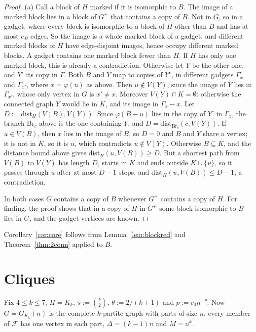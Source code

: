 \documentclass[11pt]{article}
\theoremstyle{remark}
\newcommand{\Fam}{\mathcal{F}}
\begin{document}
\begin{proof}
(a) Call a block of $H$ marked if it is isomorphic to $B$. The image of a marked block lies in a block of $G^+$ that contains a copy of $B$. Not in $G$, so in a gadget, where every block is isomorphic to a block of $H$ other than $B$ and has at most $e_B$ edges. So the image is a whole marked block of a gadget, and different marked blocks of $H$ have edge-disjoint images, hence occupy different marked blocks. A gadget contains one marked block fewer than $H$. If $H$ has only one marked block, this is already a contradiction. Otherwise let $Y$ be the other one, and $Y^\circ$ its copy in $\Gamma$. Both $B$ and $Y$ map to copies of $Y^\circ$, in different gadgets $\Gamma_x$ and $\Gamma_{x'}$, where $x=\varphi(u)$ as above. Then $u\notin V(Y)$, since the image of $Y$ lies in $\Gamma_{x'}$, whose only vertex in $G$ is $x'\ne x$. Moreover $V(Y)\cap K=\emptyset$: otherwise the connected graph $Y$ would lie in $K$, and its image in $\Gamma_x-x$. Let $D:=\mathrm{dist}_H(V(B),V(Y))$. Since $\varphi(B-u)$ lies in the copy of $Y^\circ$ in $\Gamma_x$, the branch $\mathrm{Br}_c$ above is the one containing $Y$, and $D=\mathrm{dist}_{\mathrm{Br}_c}(c,V(Y))$. If $u\in V(B)$, then $x$ lies in the image of $B$, so $D=0$ and $B$ and $Y$ share a vertex; it is not in $K$, so it is $u$, which contradicts $u\notin V(Y)$. Otherwise $B\subseteq K$, and the distance bound above gives $\mathrm{dist}_H(u,V(B))\ge D$. But a shortest path from $V(B)$ to $V(Y)$ has length $D$, starts in $K$ and ends outside $K\cup\{u\}$, so it passes through $u$ after at most $D-1$ steps, and $\mathrm{dist}_H(u,V(B))\le D-1$, a contradiction.

In both cases $G$ contains a copy of $B$ whenever $G^+$ contains a copy of $H$. For finding, the proof shows that in a copy of $H$ in $G^+$ some block isomorphic to $B$ lies in $G$, and the gadget vertices are known.
\end{proof}

Corollary~\ref{cor:core} follows from Lemma~\ref{lem:blockred} and Theorem~\ref{thm:2conn} applied to $B$.

\section{Cliques}\label{sec:clique}

Fix $4\le k\le7$, $H=K_k$, $s:=\binom k2$, $\theta:=2/(k+1)$ and $p:=c_0n^{-\theta}$. Now $G=G_{K_k}(n)$ is the complete $k$-partite graph with parts of size $n$, every member of $\Fam$ has one vertex in each part, $\Delta=(k-1)n$ and $M=n^k$.
\end{document}
